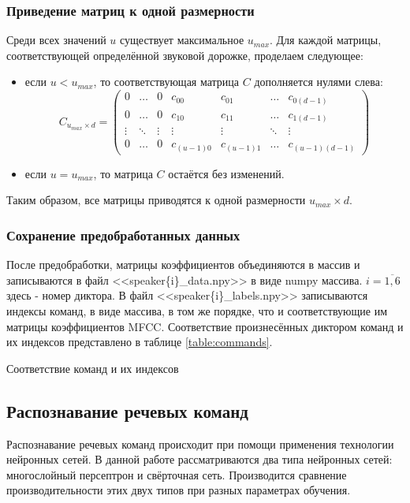 \subsubsection{Приведение матриц к одной размерности}
Среди всех значений $u$ существует максимальное $u_{max}$. Для каждой матрицы, соответствующей определённой звуковой дорожке, проделаем следующее:
\begin{itemize}[leftmargin=2cm]
	\item если $u < u_{max}$, то соответствующая матрица $C$ дополняется нулями слева:
	\begin{equation*}
		C_{u_{max} \times d} = \left(
		\begin{array}{ccccccc}
			0 & \ldots & 0 & c_{00} & c_{01} & \ldots & c_{0(d-1)}\\
			0 & \ldots & 0 & c_{10} &  c_{11} & \ldots & c_{1(d-1)}\\
			\vdots & \ddots & \vdots & \vdots & \vdots & \ddots & \vdots\\
			0 & \ldots & 0 & c_{(u-1)0} & c_{(u-1)1} & \ldots & c_{(u-1)(d-1)}
		\end{array}
		\right)
	\end{equation*}
	\item если $u = u_{max}$, то матрица $C$ остаётся без изменений.
\end{itemize}

Таким образом, все матрицы приводятся к одной размерности $u_{max} \times d$.

\subsubsection{Сохранение предобработанных данных}
После предобработки, матрицы коэффициентов объединяются в массив и записываются в файл <<speaker\{i\}\_data.npy>> в виде numpy массива. $i=\overline{1,6}$ здесь - номер диктора. В файл <<speaker\{i\}\_labels.npy>> записываются индексы команд, в виде массива, в том же порядке, что и соответствующие им матрицы коэффициентов MFCC. Соответствие произнесённых диктором команд и их индексов представлено в таблице \ref{table:commands}.
 
\begin{table}[H]
	\small
 	\centering
	\caption{Соответствие команд и их индексов}
 	\label{table:commands}
\end{table}

\subsection{Распознавание речевых команд}
Распознавание речевых команд происходит при помощи применения технологии нейронных сетей. В данной работе рассматриваются два типа нейронных сетей: многослойный персептрон и свёрточная сеть. Производится сравнение производительности этих двух типов при разных параметрах обучения.
